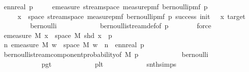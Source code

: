 \begin{isabellebody}
{\isacharequal}{\kern0pt}\ ennreal\ p\ {\isacharasterisk}{\kern0pt}\isanewline
\ \ \ \ emeasure\ {\isacharparenleft}{\kern0pt}stream{\isacharunderscore}{\kern0pt}space\ {\isacharparenleft}{\kern0pt}measure{\isacharunderscore}{\kern0pt}pmf\ {\isacharparenleft}{\kern0pt}bernoulli{\isacharunderscore}{\kern0pt}pmf\ p{\isacharparenright}{\kern0pt}{\isacharparenright}{\kern0pt}{\isacharparenright}{\kern0pt}\isanewline
\ \ \ \ \ {\isacharbraceleft}{\kern0pt}x\ {\isasymin}\ space\ {\isacharparenleft}{\kern0pt}stream{\isacharunderscore}{\kern0pt}space\ {\isacharparenleft}{\kern0pt}measure{\isacharunderscore}{\kern0pt}pmf\ {\isacharparenleft}{\kern0pt}bernoulli{\isacharunderscore}{\kern0pt}pmf\ p{\isacharparenright}{\kern0pt}{\isacharparenright}{\kern0pt}{\isacharparenright}{\kern0pt}{\isachardot}{\kern0pt}\ success\ {\isacharparenleft}{\kern0pt}init\ {\isacharplus}{\kern0pt}\ {}{\isacharparenright}{\kern0pt}\ x\ target{\isacharbraceright}{\kern0pt}{\isachardoublequoteclose}\isanewline
\ \ \ \ \ \ \isamarkupfalse%
\ \ bernoulli\isanewline
\ \ \ \ \ \ \ \ \ \ \ \ bernoulli{\isacharunderscore}{\kern0pt}stream{\isacharunderscore}{\kern0pt}def{\isacharbrackleft}{\kern0pt}of\ p{\isacharbrackright}{\kern0pt}\isanewline
\ \ \ \ \ \ \isamarkupfalse%
\ force\isanewline
\ \ \ \ \isamarkupfalse%
\ \isamarkupfalse%
\ {\isachardoublequoteopen}emeasure\ M\ {\isacharbraceleft}{\kern0pt}x\ {\isasymin}\ space\ M{\isachardot}{\kern0pt}\ shd\ x{\isacharbraceright}{\kern0pt}\ {\isacharequal}{\kern0pt}\ p{\isachardoublequoteclose}\isanewline
\ \ \ \ \isamarkupfalse%
{\isacharminus}{\kern0pt}\isanewline
\ \ \ \ \ \ \isamarkupfalse%
\ {\isachardoublequoteopen}{\isasymforall}n{\isachardot}{\kern0pt}\ emeasure\ M\ {\isacharbraceleft}{\kern0pt}w\ {\isasymin}\ space\ M{\isachardot}{\kern0pt}\ w\ {\isacharbang}{\kern0pt}{\isacharbang}{\kern0pt}\ n{\isacharbraceright}{\kern0pt}\ {\isacharequal}{\kern0pt}\ ennreal\ p{\isachardoublequoteclose}\isanewline
\ \ \ \ \ \ \isamarkupfalse%
\ bernoulli{\isacharunderscore}{\kern0pt}stream{\isacharunderscore}{\kern0pt}component{\isacharunderscore}{\kern0pt}probability{\isacharbrackleft}{\kern0pt}of\ M\ p{\isacharbrackright}{\kern0pt}\isanewline
\ \ \ \ \ \ \ \ \ \ \ \ bernoulli\isanewline
\ \ \ \ \ \ \ \ \ \ \ \ p{\isacharunderscore}{\kern0pt}gt{\isacharunderscore}{\kern0pt}{}\isanewline
\ \ \ \ \ \ \ \ \ \ \ \ p{\isacharunderscore}{\kern0pt}lt{\isacharunderscore}{\kern0pt}{}\isanewline
\ \ \ \ \ \ \ \ \ \ \ \ snth{\isachardot}{\kern0pt}simps{\isacharparenleft}{\kern0pt}{}{\isacharparenright}{\kern0pt}\isanewline

\end{isabellebody}
